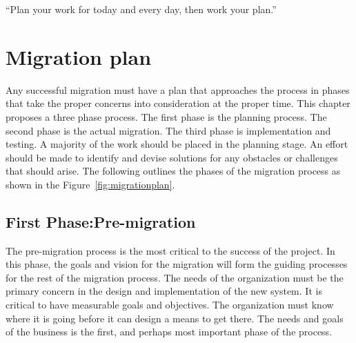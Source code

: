 \newpage
\begin{savequote}[108mm]
 ``Plan your work for today and every day, then work your plan.''
\end{savequote}
\chapter{Migration plan }
\label{chap:plans}
\vspace{-2cm}
 
 Any successful migration must have a plan that approaches the process in phases that take the proper concerns into consideration at the proper time. This chapter  proposes a three phase process. The first phase is the planning process. The second phase is the actual migration. The third phase is implementation and testing. A majority of the work should be placed in the planning stage. An effort should be made to identify and devise solutions for any obstacles or challenges that should arise. The following outlines the phases of the migration process as shown in the Figure~\ref{fig:migrationplan}. 
 
\section{First Phase:Pre-migration}
 
 The pre-migration process is the most critical to the success of the project. In this phase, the goals and vision for the migration will form the guiding processes for the rest of the migration process. The needs of the organization must be the primary concern in the design and implementation of the new system. It is critical to have measurable goals and objectives. The organization must know where it is going before it can design a means to get there. The needs and goals of the business is the first, and perhaps most important phase of the process.                                                                                                                                


